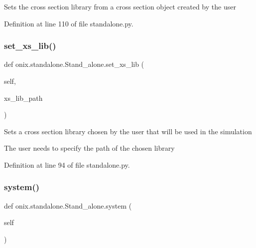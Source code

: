 \begin{DoxyVerb}Sets the cross section library from a cross section object created by the user\end{DoxyVerb}
 

Definition at line 110 of file standalone.\+py.

\mbox{\label{classonix_1_1standalone_1_1Stand__alone_a034fd40118a9221756de232f6986b48d}} 
\subsubsection{\texorpdfstring{set\+\_\+xs\+\_\+lib()}{set\_xs\_lib()}}
{\footnotesize\ttfamily def onix.\+standalone.\+Stand\+\_\+alone.\+set\+\_\+xs\+\_\+lib (\begin{DoxyParamCaption}\item[{}]{self,  }\item[{}]{xs\+\_\+lib\+\_\+path }\end{DoxyParamCaption})}

\begin{DoxyVerb}Sets a cross section library chosen by the user that will be used in the simulation

The user needs to specify the path of the chosen library\end{DoxyVerb}
 

Definition at line 94 of file standalone.\+py.

\mbox{\label{classonix_1_1standalone_1_1Stand__alone_a5daf9b0fa3f638edce64017b5e043dcc}} 
\subsubsection{\texorpdfstring{system()}{system()}\hspace{0.1cm}{\footnotesize\ttfamily [1/2]}}
{\footnotesize\ttfamily def onix.\+standalone.\+Stand\+\_\+alone.\+system (\begin{DoxyParamCaption}\item[{}]{self }\end{DoxyParamCaption})}

